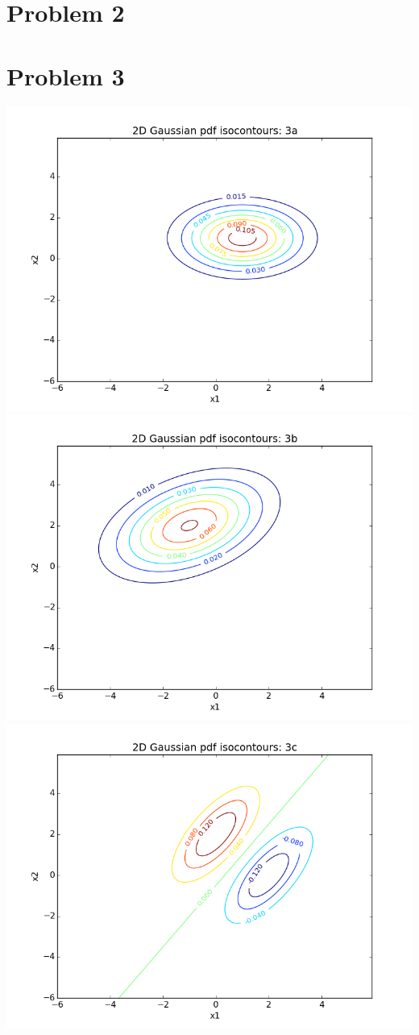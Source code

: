 \documentclass[11pt]{article}
\begin{document}
\newpage
\section*{Problem 2}


\newpage
\section*{Problem 3}
\includegraphics[scale=0.45]{images/p3a}
\includegraphics[scale=0.45]{images/p3b}
\includegraphics[scale=0.45]{images/p3c}
\end{document}
